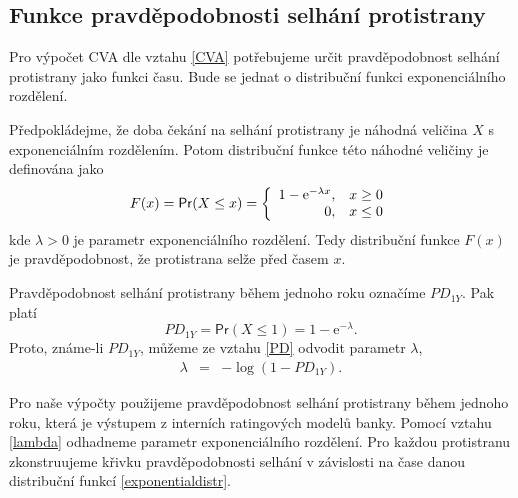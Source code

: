 \documentclass[a4paper,12pt]{report}
\theoremstyle{definition} \newtheorem{definice}[veta]{Definice}
\theoremstyle{remark}
\begin{document}
\subsection{Funkce pravděpodobnosti selhání protistrany}\label{funkce_PD_kap}
Pro výpočet CVA dle vztahu \eqref{CVA} potřebujeme určit pravděpodobnost selhání protistrany jako funkci času.
Bude se jednat o distribuční funkci exponenciálního rozdělení.

Předpokládejme, že doba čekání na selhání protistrany je náhodná veličina $X$ s exponenciálním rozdělením.
Potom distribuční funkce této náhodné veličiny je definována jako
\begin{equation}\label{exponentialdistr}
F(x)= \mathsf{Pr}(X\leq x)= \left\{ \begin{array}{r@{\quad}c}
    1-\mathrm{e}^{-\lambda x}, & x \geq 0 \\
    0, & x \leq 0 \\ \end{array} \right.
\end{equation}
kde $\lambda>0$ je parametr exponenciálního rozdělení.
Tedy distribuční funkce $F(x)$ je pravděpodobnost, že protistrana selže před časem $x$.

Pravděpodobnost selhání protistrany během jednoho roku označíme $PD_{1Y}$.
Pak platí
\begin{equation}\label{PD}
PD_{1Y}=\mathsf{Pr}(X\leq 1)=1-\mathrm{e}^{-\lambda}.
\end{equation}
Proto, známe-li $PD_{1Y}$, můžeme ze vztahu \eqref{PD} odvodit parametr $\lambda$,
\begin{eqnarray}\label{lambda}
\lambda&=&-\log(1-PD_{1Y}).
\end{eqnarray}

Pro naše výpočty použijeme pravděpodobnost selhání protistrany během jednoho roku, která je výstupem z interních ratingových modelů banky.
Pomocí vztahu \eqref{lambda} odhadneme parametr exponenciálního rozdělení. 
Pro každou protistranu zkonstruujeme křivku pravděpodobnosti selhání v závislosti na čase danou distribuční funkcí \eqref{exponentialdistr}.
\end{document}
